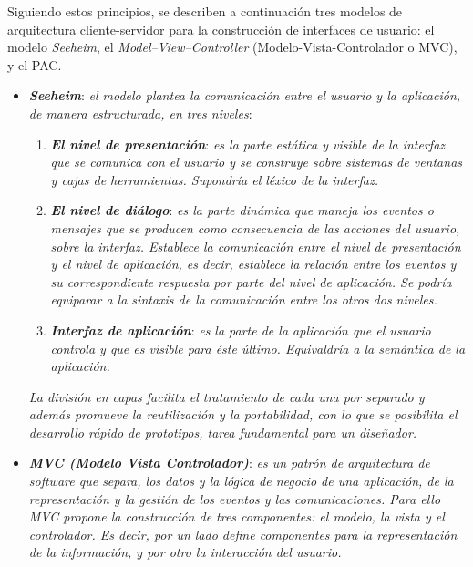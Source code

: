 \documentclass[11pt,oneside]{book}
\begin{document}
Siguiendo estos principios, se describen a continuación tres modelos de arquitectura cliente-servidor para la construcción de interfaces de usuario: el modelo \textit{Seeheim}, el \textit{Model–View–Controller} (Modelo-Vista-Controlador o MVC), y el PAC.

\begin{itemize}
\item \textit{\textbf{Seeheim}}: \textit{el modelo plantea la comunicación entre el usuario y la aplicación, de manera estructurada, en tres niveles}:
\begin{enumerate}
\item \textit{\textbf{El nivel de presentación}}: \textit{es la parte estática y visible de la interfaz que se comunica con el usuario y se construye sobre sistemas de ventanas y cajas de herramientas. Supondría el léxico de la interfaz.}

\item \textit{\textbf{El nivel de diálogo}}: \textit{es la parte dinámica que maneja los eventos o mensajes que se producen como consecuencia de las acciones del usuario, sobre la interfaz. Establece la comunicación entre el nivel de presentación y el nivel de aplicación, es decir, establece la relación entre los eventos y su correspondiente respuesta por parte del nivel de aplicación. Se podría equiparar a la sintaxis de la comunicación entre los otros dos niveles.}

\item \textit{\textbf{Interfaz de aplicación}}: \textit{es la parte de la aplicación que el usuario controla y que es visible para éste último. Equivaldría a la semántica de la aplicación.}
\end{enumerate}

\textit{La división en capas facilita el tratamiento de cada una por separado y además promueve la reutilización y la portabilidad, con lo que se posibilita el desarrollo rápido de prototipos, tarea fundamental para un diseñador.}

\item \textit{\textbf{MVC (Modelo Vista Controlador)}}: \textit{es un patrón de arquitectura de software que separa, los datos y la lógica de negocio de una aplicación, de la representación y la gestión de los eventos y las comunicaciones. Para ello MVC propone la construcción de tres componentes: el \textit{modelo}, la \textit{vista} y el \textit{controlador}. Es decir, por un lado define componentes para la representación de la información, y por otro la interacción del usuario.}


\end{itemize}
\end{document}

